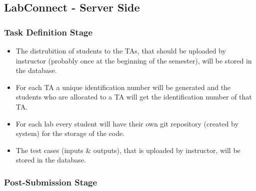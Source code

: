 \documentclass[a4paper, 12pt]{article}
\begin{document}
    \subsection{LabConnect - Server Side}

    \subsubsection{Task Definition Stage}

    \begin{itemize}
      \item The distrubition of students to the TAs, that should be uploaded by instructor (probably once at the
      beginning of the semester), will be stored in the database.
      \item For each TA a unique identification number will be generated and the students who are allocated to a
      TA will get the identification number of that TA.
      \item For each lab every student will have their own git repository (created by system) for the storage of the
      code.
      \item The test cases (inputs \& outputs), that is uploaded by instructor, will be stored in the database.
    \end{itemize}

    \subsubsection{Post-Submission Stage}
\end{document}
